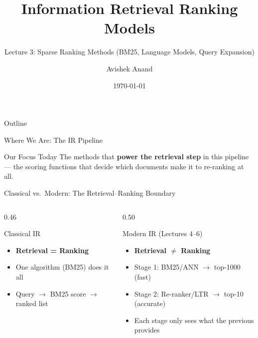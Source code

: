 \documentclass[aspectratio=169]{beamer}
\title[Ranking Models]{Information Retrieval Ranking Models}
\subtitle{Lecture 3: Sparse Ranking Methods (BM25, Language Models, Query Expansion)}
\author{Avishek Anand}
\institute{Information Retrieval}
\date{\today}
\newif\ifanimated
\newcommand{\cpause}{\ifanimated\pause\fi}
\begin{document}
\begin{frame}
\titlepage
\end{frame}

\begin{frame}{Outline}
\tableofcontents
\end{frame}


\begin{frame}{Where We Are: The IR Pipeline}
\begin{center}

\end{center}

\vspace{0.5em}
\cpause
\begin{alertblock}{Our Focus Today}
The methods that \textbf{power the retrieval step} in this pipeline --- the scoring functions that decide which documents make it to re-ranking at all.
\end{alertblock}

\end{frame}

\begin{frame}[shrink=20]{Classical vs.\ Modern: The Retrieval--Ranking Boundary}
\begin{columns}[T,onlytextwidth]
\begin{column}{0.46\textwidth}
\begin{block}{Classical IR}
\begin{itemize}
    \item \textbf{Retrieval = Ranking}
    \item One algorithm (BM25) does it all
    \item Query $\to$ BM25 score $\to$ ranked list
\end{itemize}
\end{block}
\end{column}
\begin{column}{0.50\textwidth}
\begin{block}{Modern IR \textcolor{irRerank}{(Lectures 4--6)}}
\begin{itemize}
    \item \textbf{Retrieval $\neq$ Ranking}
    \item Stage 1: BM25/ANN $\to$ top-1000 (fast)
    \item Stage 2: Re-ranker/LTR $\to$ top-10 (accurate)
    \item Each stage only sees what the previous provides
\end{itemize}
\end{block}
\end{column}
\end{columns}

\vspace{0.3em}
\begin{center}
\scalebox{0.88}{}
\end{center}
\cpause
\end{frame}
\end{document}
